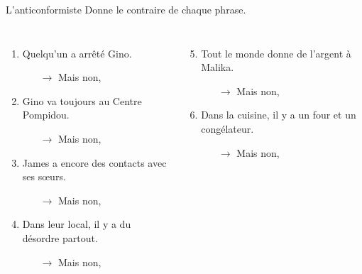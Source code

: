 \begin{frame}{L'anticonformiste}
  \footnotesize
  Donne le contraire de chaque phrase.
  \begin{columns}[t]
      \begin{enumerate}
        \item \alert{Quelqu'un} a arrêté Gino.
        \begin{itemize}
          \scriptsize
          \item[$\to$] Mais non, 
        \end{itemize}
        \item Gino va \alert{toujours} au Centre Pompidou.
        \begin{itemize}
          \scriptsize
          \item[$\to$] Mais non, 
        \end{itemize}
        \item James a \alert{encore} des contacts avec ses sœurs.
        \begin{itemize}
          \scriptsize
          \item[$\to$] Mais non, 
        \end{itemize}
        \item Dans leur local, il y a du désordre \alert{partout}.
        \begin{itemize}
          \scriptsize
          \item[$\to$] Mais non, 
        \end{itemize}
      \end{enumerate}
      \begin{enumerate}
        \setcounter{enumi}{4}
        \item \alert{Tout le monde} donne de l'argent à Malika.
        \begin{itemize}
          \scriptsize
          \item[$\to$] Mais non, 
        \end{itemize}
        \item Dans la cuisine, il y a \alert{un four et un congélateur}.
        \begin{itemize}
          \scriptsize
          \item[$\to$] Mais non, 

\end{itemize}
\end{enumerate}
\end{columns}
\end{frame}
